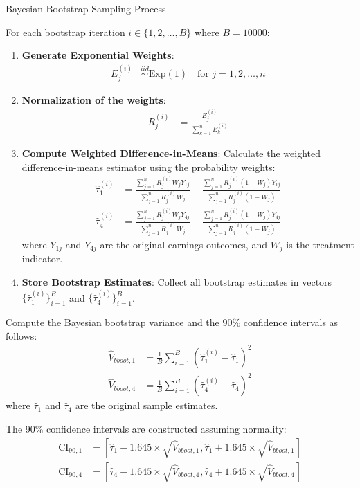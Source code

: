 \documentclass[11pt]{article}
\numberwithin{equation}{section}
\begin{document}
\begin{algorithm}
    \caption{Bayesian Bootstrap Sampling Process}
    \label{alg:bayesian_bootstrap_sampling_process}
    For each bootstrap iteration $i \in \{1, 2, \ldots, B\}$ where $B = 10000$:
    \begin{enumerate}
        \item \textbf{Generate Exponential Weights}: 
        \begin{align}
            E^{(i)}_j &\overset{iid}{\sim} \text{Exp}(1) \quad \text{for } j = 1, 2, \ldots, n
        \end{align}
        
        \item \textbf{Normalization of the weights}:
        \begin{align}
            R^{(i)}_j &= \frac{E^{(i)}_j}{\sum_{k=1}^n E^{(i)}_k}
        \end{align}
        

        \item \textbf{Compute Weighted Difference-in-Means}: Calculate the weighted difference-in-means estimator using the probability weights:
        \begin{align}
            \hat{\tau}^{(i)}_1 &= \frac{\sum_{j=1}^n R^{(i)}_j W_j Y_{1j}}{\sum_{j=1}^n R^{(i)}_j W_j} - \frac{\sum_{j=1}^n R^{(i)}_j (1-W_j) Y_{1j}}{\sum_{j=1}^n R^{(i)}_j (1-W_j)} \\
            \hat{\tau}^{(i)}_4 &= \frac{\sum_{j=1}^n R^{(i)}_j W_j Y_{4j}}{\sum_{j=1}^n R^{(i)}_j W_j} - \frac{\sum_{j=1}^n R^{(i)}_j (1-W_j) Y_{4j}}{\sum_{j=1}^n R^{(i)}_j (1-W_j)}
        \end{align}
        where $Y_{1j}$ and $Y_{4j}$ are the original earnings outcomes, and $W_j$ is the treatment indicator.
        
        \item \textbf{Store Bootstrap Estimates}: Collect all bootstrap estimates in vectors $\{\hat{\tau}^{(i)}_1\}_{i=1}^B$ and $\{\hat{\tau}^{(i)}_4\}_{i=1}^B$.
    \end{enumerate}
    
    Compute the Bayesian bootstrap variance and the 90\% confidence intervals as follows:
    \begin{align}
        \hat{V}_{bboot,1} &= \frac{1}{B} \sum_{i=1}^B \left(\hat{\tau}^{(i)}_1 - \hat{\tau}_1\right)^2 \\
        \hat{V}_{bboot,4} &= \frac{1}{B} \sum_{i=1}^B \left(\hat{\tau}^{(i)}_4 - \hat{\tau}_4\right)^2
    \end{align}
    where $\hat{\tau}_1$ and $\hat{\tau}_4$ are the original sample estimates.
    
    The 90\% confidence intervals are constructed assuming normality:
    \begin{align}
        \text{CI}_{90,1} &= \left[\hat{\tau}_1 - 1.645 \times \sqrt{\hat{V}_{bboot,1}}, \hat{\tau}_1 + 1.645 \times \sqrt{\hat{V}_{bboot,1}}\right] \\
        \text{CI}_{90,4} &= \left[\hat{\tau}_4 - 1.645 \times \sqrt{\hat{V}_{bboot,4}}, \hat{\tau}_4 + 1.645 \times \sqrt{\hat{V}_{bboot,4}}\right]
    \end{align}
\end{algorithm}
\end{document}
